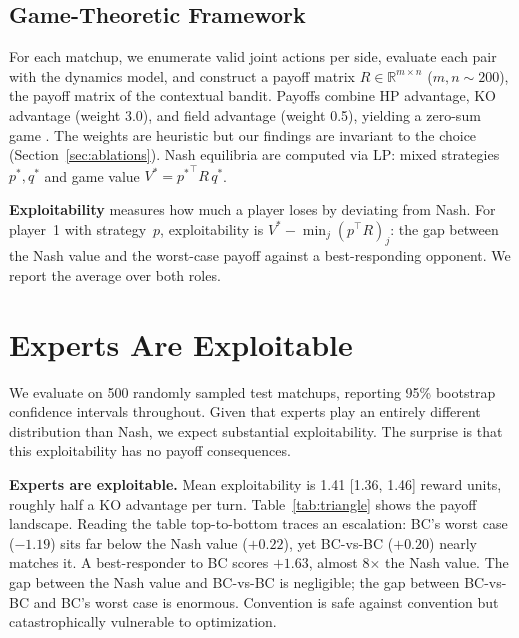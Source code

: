 \documentclass{article}
\begin{document}
\subsection{Game-Theoretic Framework}

For each matchup, we enumerate valid joint actions per side, evaluate each pair with the dynamics model, and construct a payoff matrix $R \in \mathbb{R}^{m \times n}$ ($m, n \sim 200$), the payoff matrix of the contextual bandit. Payoffs combine HP advantage, KO advantage (weight 3.0), and field advantage (weight 0.5), yielding a zero-sum game \citep{poke-env, openai2019dota, ishii2018fighting}. The weights are heuristic but our findings are invariant to the choice (Section~\ref{sec:ablations}). Nash equilibria are computed via LP: mixed strategies $p^*, q^*$ and game value $V^* = {p^*}^\top R\, q^*$.

\textbf{Exploitability} measures how much a player loses by deviating from Nash. For player~1 with strategy~$p$, exploitability is $V^* - \min_j (p^\top R)_j$: the gap between the Nash value and the worst-case payoff against a best-responding opponent. We report the average over both roles.

\section{Experts Are Exploitable}
\label{sec:convention}

We evaluate on 500 randomly sampled test matchups, reporting 95\% bootstrap confidence intervals throughout. Given that experts play an entirely different distribution than Nash, we expect substantial exploitability. The surprise is that this exploitability has no payoff consequences.

\textbf{Experts are exploitable.} Mean exploitability is 1.41 [1.36, 1.46] reward units, roughly half a KO advantage per turn. Table~\ref{tab:triangle} shows the payoff landscape. Reading the table top-to-bottom traces an escalation: BC's worst case ($-1.19$) sits far below the Nash value ($+0.22$), yet BC-vs-BC ($+0.20$) nearly matches it. A best-responder to BC scores $+1.63$, almost 8$\times$ the Nash value. The gap between the Nash value and BC-vs-BC is negligible; the gap between BC-vs-BC and BC's worst case is enormous. Convention is safe against convention but catastrophically vulnerable to optimization.
\end{document}
